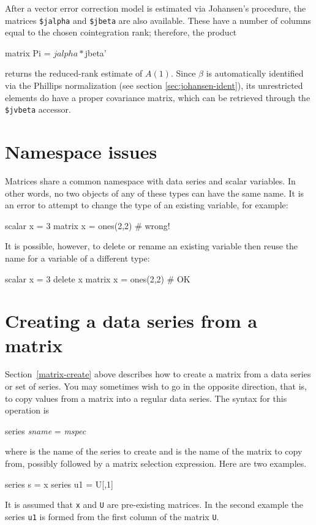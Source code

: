After a vector error correction model is estimated via Johansen's
procedure, the matrices \verb|$jalpha| and \verb|$jbeta| are
also available. These have a number of columns equal to the chosen
cointegration rank; therefore, the product
\begin{code}
matrix Pi = $jalpha * $jbeta'
\end{code}
returns the reduced-rank estimate of $A(1)$. Since $\beta$ is
automatically identified via the Phillips normalization (see section
\ref{sec:johansen-ident}), its unrestricted elements do have a proper
covariance matrix, which can be retrieved through the
\verb|$jvbeta| accessor.

\section{Namespace issues}
\label{matrix-namespace}

Matrices share a common namespace with data series and scalar
variables.  In other words, no two objects of any of these types can
have the same name.  It is an error to attempt to change the type of
an existing variable, for example:
%
\begin{code}
scalar x = 3
matrix x = ones(2,2) # wrong!
\end{code}
%
It is possible, however, to delete or rename an existing variable then
reuse the name for a variable of a different type:
\begin{code}
scalar x = 3
delete x
matrix x = ones(2,2) # OK
\end{code}


\section{Creating a data series from a matrix}
\label{matrix-create-series}

Section~\ref{matrix-create} above describes how to create a matrix
from a data series or set of series.  You may sometimes wish to go in
the opposite direction, that is, to copy values from a matrix 
into a regular data series.  The syntax for this operation is
%
\begin{textcode}
series \textsl{sname} = \textsl{mspec}
\end{textcode}
%
where  is the name of the series to create and
 is the name of the matrix to copy from, possibly followed
by a matrix selection expression.  Here are two examples.
%
\begin{code}
series s = x
series u1 = U[,1]
\end{code}
%
It is assumed that \texttt{x} and \texttt{U} are pre-existing
matrices.  In the second example the series \texttt{u1} is formed from
the first column of the matrix \texttt{U}.

